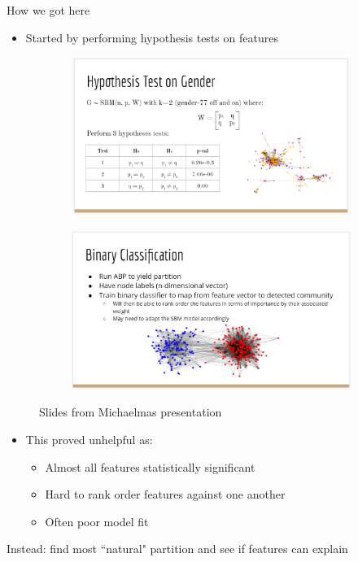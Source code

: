 \documentclass{beamer}
\begin{document}
	\begin{frame}{How we got here}
		\begin{itemize}
			\item Started by performing hypothesis tests on features 
		\end{itemize}
		
		\begin{figure}
			\begin{subfigure}{0.4\linewidth}
				\centering
				\includegraphics[width=\linewidth]{old-presentation-0}
			\end{subfigure}
			\begin{subfigure}{0.4\linewidth}
				\centering
				\includegraphics[width=\linewidth]{old-presentation}
			\end{subfigure}
			\caption{Slides from Michaelmas presentation}
		\end{figure}
	
		\begin{itemize}
			\item This proved unhelpful as:
			\begin{itemize}
				\item Almost all features statistically significant
				\item Hard to rank order features against one another
				\item Often poor model fit
			\end{itemize}
		\end{itemize}
	
		\begin{block}{}
			Instead: find most ``natural" partition and see if features can explain
		\end{block}
	\end{frame}
\end{document}
